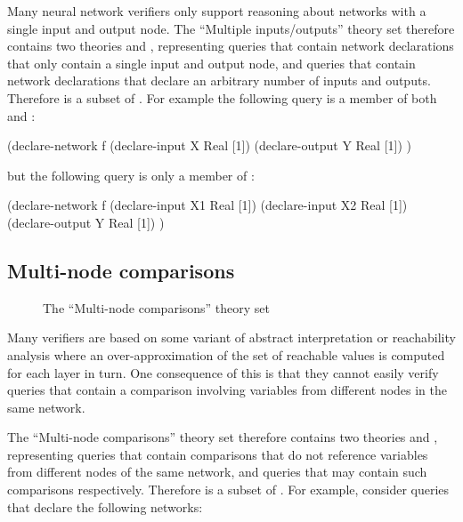 Many neural network verifiers only support reasoning about networks with a single input and output node. The ``Multiple inputs/outputs'' theory set therefore contains two theories \sio{} and \mio{}, representing queries that contain network declarations that only contain a single input and output node, and queries that contain network declarations that declare an arbitrary number of inputs and outputs. Therefore \sio{} is a subset of \mio{}. For example the following query is a member of both \sio{} and \mio{}:

\begin{code}[style=lbnf]
(declare-network f
    (declare-input  X Real [1])
    (declare-output Y Real [1])
)
\end{code}

but the following query is only a member of \mio{}:

\begin{code}[style=lbnf]
(declare-network f
    (declare-input  X1 Real [1])
    (declare-input  X2 Real [1])
    (declare-output Y  Real [1])
)
\end{code}

\subsection{Multi-node comparisons}\label{sec:arch}

\begin{figure}[h]
\centering
{}
\caption{The ``Multi-node comparisons'' theory set}
\label{fig:multi-node-comparisons-theory-set}
\end{figure}

Many verifiers are based on some variant of abstract interpretation or reachability analysis where an over-approximation of the set of reachable values is computed for each layer in turn.
One consequence of this is that they cannot easily verify queries that contain a comparison involving variables from different nodes in the same network.

The ``Multi-node comparisons'' theory set therefore contains two theories \snc{} and \mnc{}, representing queries that contain comparisons that do not reference variables from different nodes of the same network, and queries that may contain such comparisons respectively. Therefore \snc{} is a subset of \mnc{}. For example, consider queries that declare the following networks:

